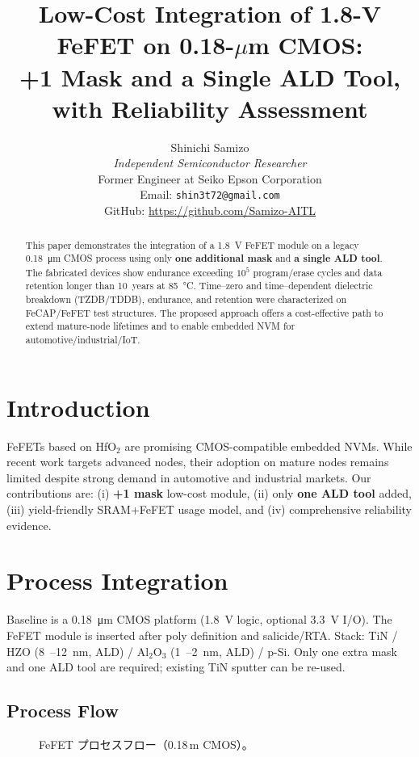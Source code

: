 \documentclass[conference]{IEEEtran}
\title{Low-Cost Integration of 1.8-V FeFET on 0.18-\(\mu\)m CMOS:\\
+1 Mask and a Single ALD Tool, with Reliability Assessment}
\author{%
Shinichi Samizo\\
\emph{Independent Semiconductor Researcher}\\
Former Engineer at Seiko Epson Corporation\\
Email: \texttt{shin3t72@gmail.com}\\
GitHub: \url{https://github.com/Samizo-AITL}
}
\begin{document}
\maketitle

\begin{abstract}
This paper demonstrates the integration of a \SI{1.8}{V} FeFET module on a legacy \SI{0.18}{\micro m} CMOS process using only \textbf{one additional mask} and \textbf{a single ALD tool}. 
The fabricated devices show endurance exceeding \(10^{5}\) program/erase cycles and data retention longer than 10~years at \SI{85}{\celsius}. 
Time–zero and time–dependent dielectric breakdown (TZDB/TDDB), endurance, and retention were characterized on FeCAP/FeFET test structures. 
The proposed approach offers a cost-effective path to extend mature-node lifetimes and to enable embedded NVM for automotive/industrial/IoT.
\end{abstract}

\section{Introduction}
FeFETs based on HfO\(_2\) are promising CMOS-compatible embedded NVMs. 
While recent work targets advanced nodes, their adoption on mature nodes remains limited despite strong demand in automotive and industrial markets. 
Our contributions are: (i) \textbf{+1 mask} low-cost module, (ii) only \textbf{one ALD tool} added, (iii) yield-friendly SRAM+FeFET usage model, and (iv) comprehensive reliability evidence.

\section{Process Integration}
Baseline is a \SI{0.18}{\micro m} CMOS platform (\SI{1.8}{V} logic, optional \SI{3.3}{V} I/O). 
The FeFET module is inserted after poly definition and salicide/RTA. 
Stack: TiN / HZO (\SI{8}{–}\SI{12}{nm}, ALD) / Al\(_2\)O\(_3\) (\SI{1}{–}\SI{2}{nm}, ALD) / p-Si. 
Only one extra mask and one ALD tool are required; existing TiN sputter can be re-used.

\subsection{Process Flow}
\begin{figure}[t]
\centering
{}
\caption{FeFET プロセスフロー（0.18\,\textmu m CMOS）。}
\end{figure}
\end{document}
